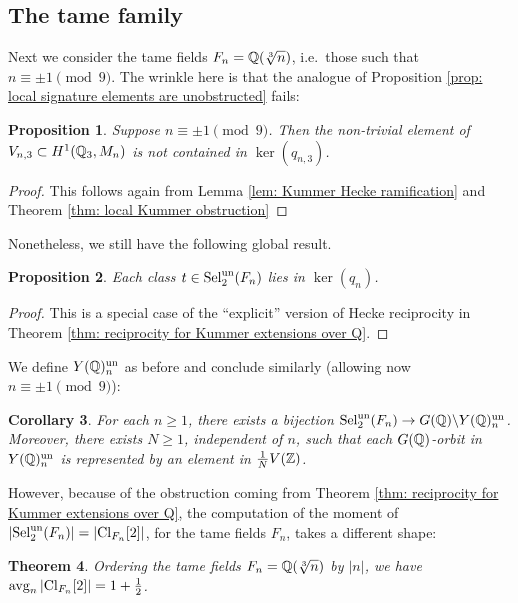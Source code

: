 \documentclass[11pt,a4paper]{amsart}
\def\Z{{\rm \mathbb{Z}}}
\def\Q{{\rm \mathbb{Q}}}
\def\un{{\rm un}}
\def\avg{{\rm avg}}
\def\Cl{{\rm Cl}}
\def\Sel{{\rm Sel}}
\numberwithin{equation}{section}
\newtheorem{theorem}{Theorem}[section]
\newtheorem{corollary}[theorem]{Corollary}
\newtheorem{proposition}[theorem]{Proposition}
\begin{document}
\subsection{The tame family}
Next we consider the tame fields $F_n = \Q(\sqrt[3]{n})$, i.e.\ those such that $n \equiv \pm 1\pmod{9}$. The wrinkle  here is that the analogue of Proposition \ref{prop: local signature elements are unobstructed} fails:

\begin{proposition}\label{prop: tame failure II}
Suppose $n \equiv \pm 1\pmod{9}$. Then the non-trivial element of $V_{n,3} \subset H^1(\Q_3, M_n)$ is not contained in $\ker(q_{n,3})$. 
\end{proposition}
\begin{proof}
This follows again from Lemma \ref{lem: Kummer Hecke ramification} and Theorem \ref{thm: local Kummer obstruction}
\end{proof}

Nonetheless, we still have the following global result. 


\begin{proposition}\label{prop: selmer elements are unobstructed}
Each class $t \in \Sel_2^\un(F_n)$ lies in $\ker(q_n)$. 
\end{proposition}
\begin{proof}
This is a special case of the ``explicit'' version of Hecke reciprocity in Theorem \ref{thm: reciprocity for Kummer extensions over Q}.
\end{proof}


We define $Y(\Q)_n^\un$ as before and conclude similarly (allowing now $n \equiv \pm1 \pmod9$):

\begin{corollary}\label{cor: Z bijection}
For each $n \geq 1$, there exists a bijection $\Sel_2^\un(F_n) \to G(\Q)\backslash Y(\Q)^\un_n$. Moreover, there exists $N \geq 1$,  independent of $n$, such that each $G(\Q)$-orbit in $Y(\Q)^\un_n$ is represented by an element in $\frac{1}{N}V(\Z)$. 
\end{corollary}

However, because of the obstruction coming from Theorem \ref{thm: reciprocity for Kummer extensions over Q}, the computation of the moment of $|\Sel_2^\un(F_n)| = |\Cl_{F_n}[2]|$,  for the tame fields $F_n$, takes a different shape:

\begin{theorem}\label{thm: tame selmer avg}
    Ordering the tame fields $F_n = \Q(\sqrt[3]{n})$ by $|n|$, we have $\avg_n\, |\Cl_{F_n}[2]|= 1 + \frac12 $.
\end{theorem}
\end{document}
